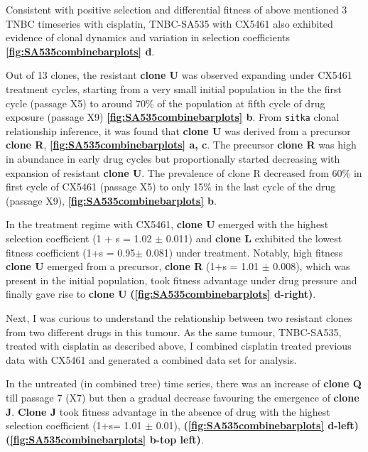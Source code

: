 Consistent with positive selection and differential fitness of above mentioned 3 TNBC timeseries with cisplatin, TNBC-SA535 with CX5461 also exhibited evidence of clonal dynamics and variation in selection coefficients \textbf{\autoref{fig:SA535combinebarplots} d}. 

Out of 13 clones, the resistant \textbf{clone U} was observed expanding under CX5461 treatment cycles, starting from a very small initial population in the the first cycle (passage X5) to around 70\% of the population at fifth cycle of drug exposure (passage X9) \textbf{\autoref{fig:SA535combinebarplots} b}. From \texttt{sitka} clonal relationship inference, it was found that \textbf{clone U} was derived from a precursor \textbf{clone R},  \textbf{\autoref{fig:SA535combinebarplots} a, c}. The precursor \textbf{clone R} was high in abundance in early drug cycles but proportionally started decreasing with expansion of resistant \textbf{clone U}. The prevalence of clone R decreased from 60\% in first cycle of CX5461 (passage X5) to only 15\% in the last cycle of the drug (passage X9), \textbf{\autoref{fig:SA535combinebarplots} b}. 


In the treatment regime with CX5461, \textbf{clone U} emerged with the highest selection coefficient (1 + s = 1.02 $\pm$ 0.011) and \textbf{clone L} exhibited the lowest fitness coefficient (1+s = 0.95$\pm$ 0.081) under treatment. Notably, high fitness \textbf{clone U} emerged from a precursor, \textbf{clone R} (1+s = 1.01 $\pm$ 0.008), which was present in the initial population, took fitness advantage under drug pressure and finally gave rise to \textbf{clone U} \textbf{(\autoref{fig:SA535combinebarplots} d-right)}. 

Next, I was curious to understand the relationship between two resistant clones from two different drugs in this tumour. As the same tumour, TNBC-SA535, treated with cisplatin as described above, I combined cisplatin treated previous data with CX5461 and generated a combined data set for analysis. 


In the untreated (in combined tree) time series, there was an increase of \textbf{clone Q} till passage 7 (X7) but then a gradual decrease favouring the emergence of \textbf{clone J}. \textbf{Clone J} took fitness advantage in the absence of drug with the highest selection coefficient (1+s= 1.01 $\pm$ 0.01),  \textbf{(\autoref{fig:SA535combinebarplots} d-left)}  \textbf{(\autoref{fig:SA535combinebarplots} b-top left)}. 

